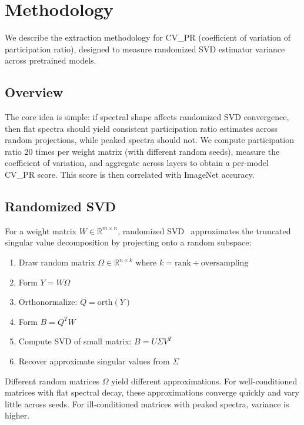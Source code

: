 \section{Methodology}
\label{sec:methodology}

We describe the extraction methodology for CV\_PR (coefficient of variation of participation ratio), designed to measure randomized SVD estimator variance across pretrained models.

\subsection{Overview}

The core idea is simple: if spectral shape affects randomized SVD convergence, then flat spectra should yield consistent participation ratio estimates across random projections, while peaked spectra should not. We compute participation ratio 20 times per weight matrix (with different random seeds), measure the coefficient of variation, and aggregate across layers to obtain a per-model CV\_PR score. This score is then correlated with ImageNet accuracy.

\subsection{Randomized SVD}

For a weight matrix $W \in \mathbb{R}^{m \times n}$, randomized SVD~\cite{halko2011finding} approximates the truncated singular value decomposition by projecting onto a random subspace:

\begin{enumerate}
    \item Draw random matrix $\Omega \in \mathbb{R}^{n \times k}$ where $k = \text{rank} + \text{oversampling}$
    \item Form $Y = W\Omega$
    \item Orthonormalize: $Q = \text{orth}(Y)$
    \item Form $B = Q^T W$
    \item Compute SVD of small matrix: $B = U\Sigma V^T$
    \item Recover approximate singular values from $\Sigma$
\end{enumerate}

Different random matrices $\Omega$ yield different approximations. For well-conditioned matrices with flat spectral decay, these approximations converge quickly and vary little across seeds. For ill-conditioned matrices with peaked spectra, variance is higher.

